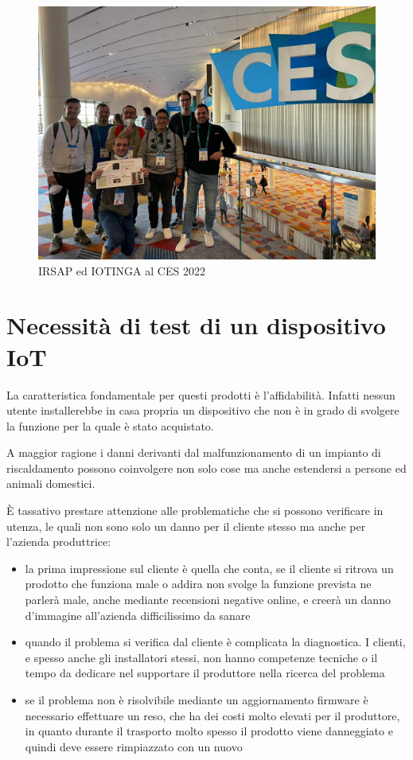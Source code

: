 \documentclass[12pt,a4paper,twoside,titlepage]{book}
\begin{document}
\begin{figure}[ht]
    \centering
    \includegraphics[width=12cm]{img/ces.jpeg}
    \caption{IRSAP ed IOTINGA al CES 2022}
    \label{fig:ces}
\end{figure}

\section{Necessità di test di un dispositivo IoT}

La caratteristica fondamentale per questi prodotti è l'affidabilità.
Infatti nessun utente installerebbe in casa propria un dispositivo che
non è in grado di svolgere la funzione per la quale è stato acquistato.

A maggior ragione i danni derivanti dal malfunzionamento di un impianto
di riscaldamento possono coinvolgere non solo cose ma anche estendersi
a persone ed animali domestici.

È tassativo prestare attenzione alle problematiche che si possono verificare
in utenza, le quali non sono solo un danno per il cliente stesso ma anche
per l'azienda produttrice:

\begin{itemize}
\item la prima impressione sul cliente è quella che conta, se il cliente si ritrova
    un prodotto che funziona male o addira non svolge la funzione prevista ne parlerà
    male, anche mediante recensioni negative online, e creerà un danno d'immagine all'azienda
    difficilissimo da sanare
\item quando il problema si verifica dal cliente è complicata la diagnostica. I clienti,
    e spesso anche gli installatori stessi, non hanno competenze tecniche o il
    tempo da dedicare nel supportare il produttore nella ricerca del problema
\item se il problema non è risolvibile mediante un aggiornamento firmware è necessario
    effettuare un reso, che ha dei costi molto elevati per il produttore, in quanto
    durante il trasporto molto spesso il prodotto viene danneggiato e quindi deve
    essere rimpiazzato con un nuovo
\end{itemize}
\end{document}
